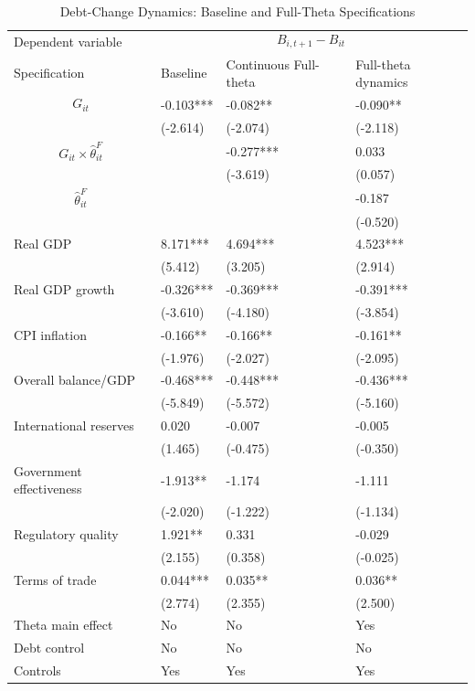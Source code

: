 \begin{table}[H]\centering
\begin{threeparttable}
\caption{Debt-Change Dynamics: Baseline and Full-Theta Specifications}
\label{tab:debt_change_combined_fulltheta}
\scriptsize
\begin{tabularx}{\textwidth}{lYYY}
\toprule
Dependent variable &  \\
\cmidrule(lr){2-4}
Specification & Baseline & Continuous Full-theta & Full-theta dynamics \\
\midrule
$$G_{it}$$ & -0.103*** & -0.082** & -0.090** \\
 & (-2.614) & (-2.074) & (-2.118) \\
$$G_{it}\times\widehat{\theta}^{F}_{it}$$ &  & -0.277*** & 0.033 \\
 &  & (-3.619) & (0.057) \\
$$\widehat{\theta}^{F}_{it}$$ &  &  & -0.187 \\
 &  &  & (-0.520) \\
Real GDP & 8.171*** & 4.694*** & 4.523*** \\
 & (5.412) & (3.205) & (2.914) \\
Real GDP growth & -0.326*** & -0.369*** & -0.391*** \\
 & (-3.610) & (-4.180) & (-3.854) \\
CPI inflation & -0.166** & -0.166** & -0.161** \\
 & (-1.976) & (-2.027) & (-2.095) \\
Overall balance/GDP & -0.468*** & -0.448*** & -0.436*** \\
 & (-5.849) & (-5.572) & (-5.160) \\
International reserves & 0.020 & -0.007 & -0.005 \\
 & (1.465) & (-0.475) & (-0.350) \\
Government effectiveness & -1.913** & -1.174 & -1.111 \\
 & (-2.020) & (-1.222) & (-1.134) \\
Regulatory quality & 1.921** & 0.331 & -0.029 \\
 & (2.155) & (0.358) & (-0.025) \\
Terms of trade & 0.044*** & 0.035** & 0.036** \\
 & (2.774) & (2.355) & (2.500) \\
\midrule
Theta main effect & No & No & Yes \\
Debt control & No & No & No \\
Controls & Yes & Yes & Yes \\

\end{tabularx}
\end{threeparttable}
\end{table}
